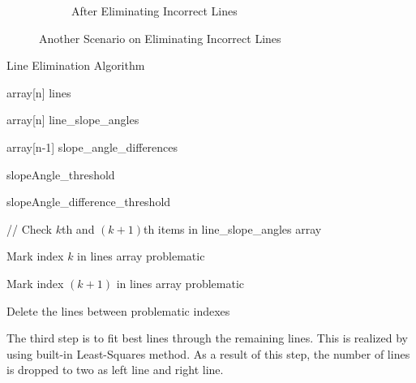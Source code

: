 \documentclass[a4paper,12pt]{article}
\begin{document}
\begin{enumerate}
\begin{figure}[h!]
\begin{subfigure}{.46\textwidth}
\caption{\label{fig:dataP_explained4} After Eliminating Incorrect Lines}

\end{subfigure}

\caption{\label{fig:dataP_explainedBroken} Another Scenario on Eliminating Incorrect Lines}

\end{figure}

\begin{algorithm}[H]

\caption{Line Elimination Algorithm}

\label{algo:eliminateLines}

\DontPrintSemicolon


array[n] lines \;

array[n] line\_slope\_angles \;

array[n-1] slope\_angle\_differences \;


slopeAngle\_threshold \;

slopeAngle\_difference\_threshold \;




{ 


{

// Check $k$th and $(k+1)$th items in line\_slope\_angles array \;


{

Mark index $k$ in lines array problematic

}	


{

Mark index $(k+1)$ in lines array problematic

}	

}

}

Delete the lines between problematic indexes \;


\end{algorithm}




The third step is to fit best lines through the remaining lines. This is realized by using built-in Least-Squares method. As a result of this step, the number of lines is dropped to two as left line and right line.



\end{enumerate}
\end{document}
